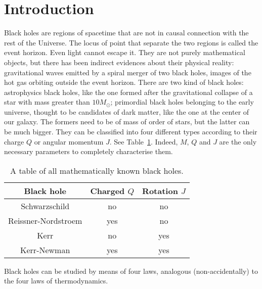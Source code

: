 \chapter*{Introduction}

    Black holes are regions of spacetime that are not in causal connection with the rest of the Universe. The locus of point that separate the two regions is called the event horizon. Even light cannot escape it. They are not purely mathematical objects, but there has been indirect evidences about their physical reality: gravitational waves emitted by a spiral merger of two black holes, images of the hot gas orbiting outside the event horizon. There are two kind of black holes: astrophysics black holes, like the one formed after the gravitational collapse of a star with mass greater than $10 M_\odot$; primordial black holes belonging to the early universe, thought to be candidates of dark matter, like the one at the center of our galaxy. The formers need to be of mass of order of stars, but the latter can be much bigger. They can be classified into four different types according to their charge $Q$ or angular momentum $J$. See Table~\ref{tab:bh}. Indeed, $M$, $Q$ and $J$ are the only necessary parameters to completely characterise them. 
    
    \begin{table}[h!]
        \centering
        \begin{tabular}{c | c | c}
            Black hole & Charged $Q$ & Rotation $J$ \\
            \hline
            Schwarzschild & no & no \\
            Reissner-Nordstroem & yes & no \\
            Kerr & no & yes \\
            Kerr-Newman & yes & yes \\
        \end{tabular}
        \caption{A table of all mathematically known black holes.}
        \label{tab:bh}
    \end{table}

    Black holes can be studied by means of four laws, analogous (non-accidentally) to the four laws of thermodynamics.